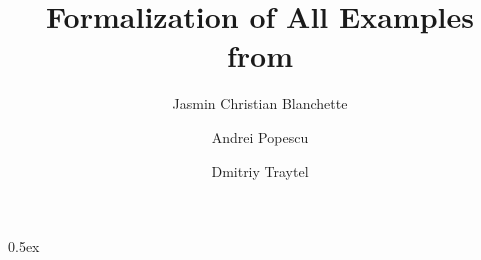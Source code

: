 \documentclass[11pt,a4paper]{article}
\begin{document}
\title{Formalization of All Examples from \cite{HJ11UFPtech}}
\author{Jasmin Christian Blanchette \and Andrei Popescu \and Dmitriy Traytel}
\maketitle

\tableofcontents




\pagebreak

\parindent 0pt\parskip 0.5ex


\end{document}
